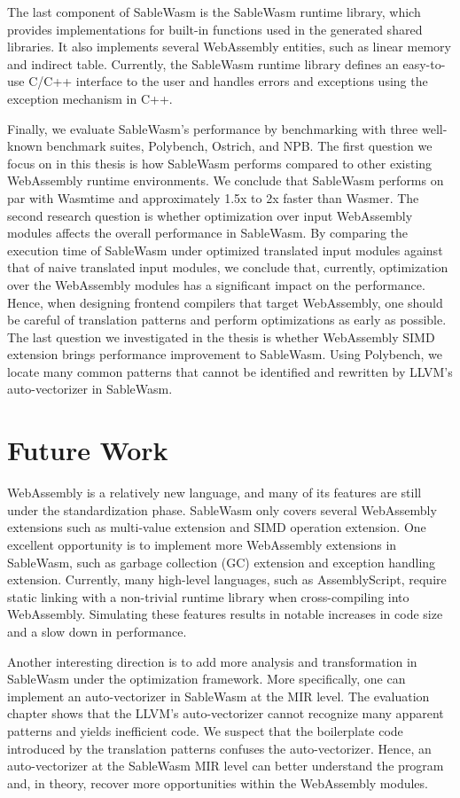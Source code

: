 The last component of SableWasm is the SableWasm runtime library, which provides implementations for built-in functions used in the generated shared libraries. It also implements several WebAssembly entities, such as linear memory and indirect table. Currently, the SableWasm runtime library defines an easy-to-use C/C++ interface to the user and handles errors and exceptions using the exception mechanism in C++.

Finally, we evaluate SableWasm's performance by benchmarking with three well-known benchmark suites, Polybench, Ostrich, and NPB. The first question we focus on in this thesis is how SableWasm performs compared to other existing WebAssembly runtime environments. We conclude that SableWasm performs on par with Wasmtime and approximately 1.5x to 2x faster than Wasmer. The second research question is whether optimization over input WebAssembly modules affects the overall performance in SableWasm. By comparing the execution time of SableWasm under optimized translated input modules against that of naive translated input modules, we conclude that, currently, optimization over the WebAssembly modules has a significant impact on the performance. Hence, when designing frontend compilers that target WebAssembly, one should be careful of translation patterns and perform optimizations as early as possible. The last question we investigated in the thesis is whether WebAssembly SIMD extension brings performance improvement to SableWasm. Using Polybench, we locate many common patterns that cannot be identified and rewritten by LLVM's auto-vectorizer in SableWasm.

\section*{Future Work}

WebAssembly is a relatively new language, and many of its features are still under the standardization phase. SableWasm only covers several WebAssembly extensions such as multi-value extension and SIMD operation extension. One excellent opportunity is to implement more WebAssembly extensions in SableWasm, such as garbage collection (GC) extension and exception handling extension. Currently, many high-level languages, such as AssemblyScript, require static linking with a non-trivial runtime library when cross-compiling into WebAssembly. Simulating these features results in notable increases in code size and a slow down in performance.

Another interesting direction is to add more analysis and transformation in SableWasm under the optimization framework. More specifically, one can implement an auto-vectorizer in SableWasm at the MIR level. The evaluation chapter shows that the LLVM's auto-vectorizer cannot recognize many apparent patterns and yields inefficient code. We suspect that the boilerplate code introduced by the translation patterns confuses the auto-vectorizer. Hence, an auto-vectorizer at the SableWasm MIR level can better understand the program and, in theory, recover more opportunities within the WebAssembly modules.

